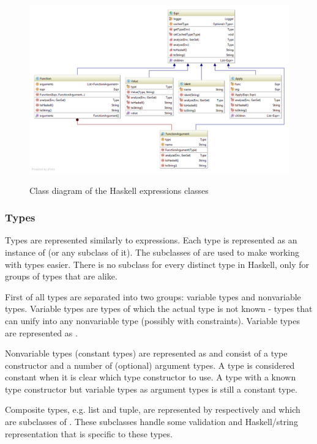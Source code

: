 \begin{figure}[h]
\centering
\includegraphics[scale=0.4]{Images/classdiagram-expr}
\label{fig:classdiagram-expr}
\caption{Class diagram of the Haskell expressions classes}
\end{figure}

\subsubsection{Types}

Types are represented similarly to expressions.
Each type is represented as an instance of  (or any subclass of it).
The subclasses of  are used to make working with types easier.
There is no subclass for every distinct type in Haskell, only for groups of types that are alike.

First of all types are separated into two groups: variable types and nonvariable types.
Variable types are types of which the actual type is not known - types that can unify into any nonvariable type (possibly with constraints).
Variable types are represented as .

Nonvariable types (constant types) are represented as  and consist of a type constructor and a number of (optional) argument types.
A type is considered constant when it is clear which type constructor to use. A type with a known type constructor but variable types as argument types is still a constant type.

Composite types, e.g. list and tuple, are represented by respectively  and  which are subclasses of .
These subclasses handle some validation and Haskell/string representation that is specific to these types.

